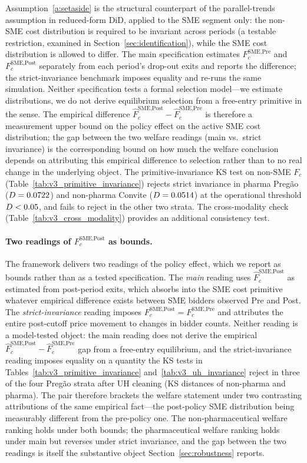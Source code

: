 Assumption~\ref{a:setaside} is the structural counterpart of the parallel-trends assumption in reduced-form DiD, applied to the SME segment only: the non-SME cost distribution is required to be invariant across periods (a testable restriction, examined in Section~\ref{sec:identification}), while the SME cost distribution is allowed to differ. The main specification estimates $F_c^{\text{SME,Pre}}$ and $F_c^{\text{SME,Post}}$ separately from each period's drop-out exits and reports the difference; the strict-invariance benchmark imposes equality and re-runs the same simulation. Neither specification tests a formal selection model---we estimate distributions, we do not derive equilibrium selection from a free-entry primitive in the \citet{krasnokutskayaseim2011} sense. The empirical difference $\hat F_c^{\text{SME,Post}} - \hat F_c^{\text{SME,Pre}}$ is therefore a measurement upper bound on the policy effect on the active SME cost distribution; the gap between the two welfare readings (main vs.\ strict invariance) is the corresponding bound on how much the welfare conclusion depends on attributing this empirical difference to selection rather than to no real change in the underlying object. The primitive-invariance KS test on non-SME $F_c$ (Table~\ref{tab:v3_primitive_invariance}) rejects strict invariance in pharma Preg\~ao ($D = 0.0722$) and non-pharma Convite ($D = 0.0514$) at the operational threshold $D < 0.05$, and fails to reject in the other two strata. The cross-modality check (Table~\ref{tab:v3_cross_modality}) provides an additional consistency test.

\paragraph{Two readings of $F_c^{\text{SME,Post}}$ as bounds.} The framework delivers two readings of the policy effect, which we report as bounds rather than as a tested specification. The \emph{main} reading uses $\hat F_c^{\text{SME,Post}}$ as estimated from post-period exits, which absorbs into the SME cost primitive whatever empirical difference exists between SME bidders observed Pre and Post. The \emph{strict-invariance} reading imposes $F_c^{\text{SME,Post}} = F_c^{\text{SME,Pre}}$ and attributes the entire post-cutoff price movement to changes in bidder counts. Neither reading is a model-tested object: the main reading does not derive the empirical $\hat F_c^{\text{SME,Post}} - \hat F_c^{\text{SME,Pre}}$ gap from a free-entry equilibrium, and the strict-invariance reading imposes equality on a quantity the KS tests in Tables~\ref{tab:v3_primitive_invariance} and~\ref{tab:v3_uh_invariance} reject in three of the four Preg\~ao strata after UH cleaning (KS distances of \ksNpPregaoUH{} non-pharma and \ksPharmaPregaoUH{} pharma). The pair therefore brackets the welfare statement under two contrasting attributions of the same empirical fact---the post-policy SME distribution being measurably different from the pre-policy one. The non-pharmaceutical welfare ranking holds under both bounds; the pharmaceutical welfare ranking holds under main but reverses under strict invariance, and the gap between the two readings is itself the substantive object Section~\ref{sec:robustness} reports.

